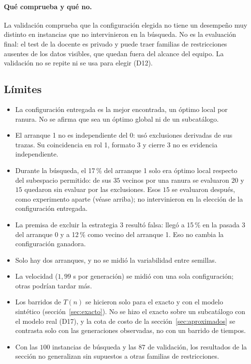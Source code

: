 \paragraph{Qué comprueba y qué no.} La validación comprueba que la configuración elegida no
tiene un desempeño muy distinto en instancias que no intervinieron en la búsqueda. No es la
evaluación final: el test de la docente es privado y puede traer familias de restricciones
ausentes de los datos visibles, que quedan fuera del alcance del equipo. La validación no se
repite ni se usa para elegir (D12).

\subsection{Límites}

\begin{itemize}
  \item La configuración entregada es la mejor encontrada, un óptimo local por ranura. No se
  afirma que sea un óptimo global ni de un subcatálogo.
  \item El arranque 1 no es independiente del 0: usó exclusiones derivadas de sus trazas.
  Su coincidencia en rol 1, formato 3 y cierre 3 no es evidencia independiente.
  \item Durante la búsqueda, el 17\,\% del arranque 1 solo era óptimo local respecto del
  subespacio permitido: de sus $35$ vecinos por una ranura se evaluaron $20$ y $15$ quedaron
  sin evaluar por las exclusiones. Esos $15$ se evaluaron después, como experimento aparte
  (véase arriba); no intervinieron en la elección de la configuración entregada.
  \item La premisa de excluir la estrategia 3 resultó falsa: llegó a 15\,\% en la pasada 3
  del arranque 0 y a 12\,\% como vecino del arranque 1. Eso no cambia la configuración
  ganadora.
  \item Solo hay dos arranques, y no se midió la variabilidad entre semillas.
  \item La velocidad ($1{,}99$ s por generación) se midió con una sola configuración; otras
  podrían tardar más.
  \item Los barridos de $T(n)$ se hicieron solo para el exacto y con el modelo sintético
  (sección~\ref{sec:exacto}). No se hizo el exacto sobre un subcatálogo con el modelo real
  (D17), y la cota de costo de la sección~\ref{sec:aproximados} se contrasta solo con las
  generaciones observadas, no con un barrido de tiempos.
  \item Con las $100$ instancias de búsqueda y las $87$ de validación, los resultados de la
  sección no generalizan sin supuestos a otras familias de restricciones.
\end{itemize}

